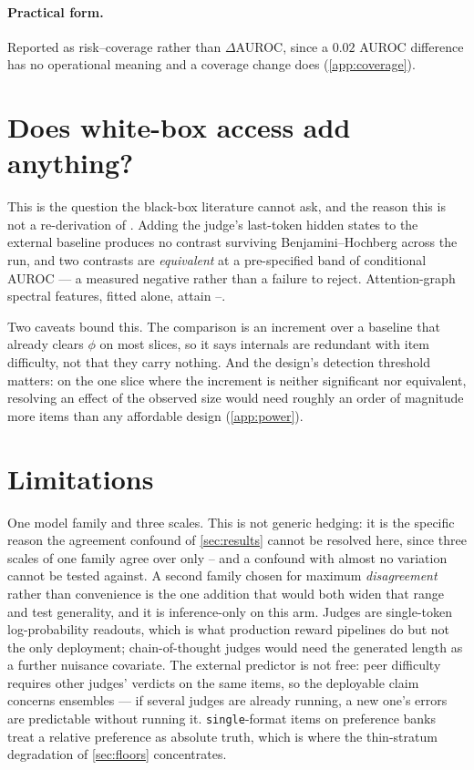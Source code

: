 \documentclass{article}
\begin{document}
\paragraph{Practical form.} Reported as risk--coverage rather than $\Delta$AUROC, since a $0.02$
AUROC difference has no operational meaning and a coverage change does (\cref{app:coverage}).

\section{Does white-box access add anything?}
\label{sec:whitebox}

This is the question the black-box literature cannot ask, and the reason this is not a re-derivation
of \citet{tan2026conformal}. Adding the judge's last-token hidden states to the external baseline
produces no contrast surviving Benjamini--Hochberg across the run, and two contrasts are
\emph{equivalent} at a pre-specified band of \EqBand{} conditional AUROC --- a measured negative
rather than a failure to reject. Attention-graph spectral features, fitted alone, attain
\MTwoOnlyLo{}--\MTwoOnlyHi{}.

Two caveats bound this. The comparison is an increment over a baseline that already clears $\phi$ on
most slices, so it says internals are redundant with item difficulty, not that they carry nothing.
And the design's detection threshold matters: on the one slice where the increment is neither
significant nor equivalent, resolving an effect of the observed size would need roughly an order of
magnitude more items than any affordable design (\cref{app:power}).

\section{Limitations}
\label{sec:limitations}

One model family and three scales. This is not generic hedging: it is the specific reason the
agreement confound of \cref{sec:results} cannot be resolved here, since three scales of one family
agree over only \AgreeLo{}--\AgreeHi{} and a confound with almost no variation cannot be tested
against. A second family chosen for maximum \emph{disagreement} rather than convenience is the one
addition that would both widen that range and test generality, and it is inference-only on this
arm. Judges are single-token log-probability readouts, which is what
production reward pipelines do but not the only deployment; chain-of-thought judges would need the
generated length as a further nuisance covariate. The external predictor is not free: peer difficulty
requires other judges' verdicts on the same items, so the deployable claim concerns ensembles ---
if several judges are already running, a new one's errors are predictable without running it.
\texttt{single}-format items on preference banks treat a relative preference as absolute truth,
which is where the thin-stratum degradation of \cref{sec:floors} concentrates.
\end{document}
